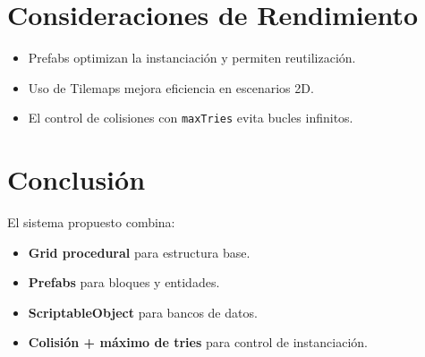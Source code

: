\documentclass[a4paper,12pt]{article}
\begin{document}
\section{Consideraciones de Rendimiento}
\begin{itemize}
    \item Prefabs optimizan la instanciación y permiten reutilización.
    \item Uso de Tilemaps mejora eficiencia en escenarios 2D.
    \item El control de colisiones con \texttt{maxTries} evita bucles infinitos.
\end{itemize}

\section{Conclusión}
El sistema propuesto combina:
\begin{itemize}
    \item \textbf{Grid procedural} para estructura base.
    \item \textbf{Prefabs} para bloques y entidades.
    \item \textbf{ScriptableObject} para bancos de datos.
    \item \textbf{Colisión + máximo de tries} para control de instanciación.
\end{itemize}
\end{document}

